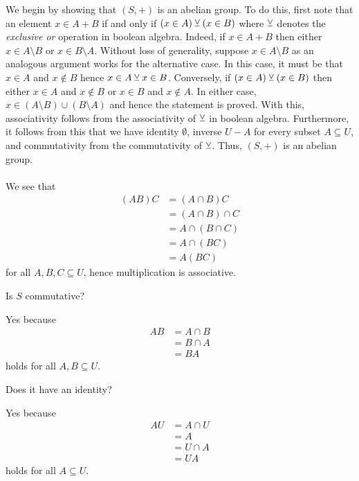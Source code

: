 \begin{enumerate}[(a)]
\begin{solution}
		We begin by showing that $(S, +)$ is an abelian group. To do this, first note that an element $x \in A + B$ if and only if $(x \in A) \veebar (x \in B)$ where $\veebar$ denotes the \textit{exclusive or} operation in boolean algebra. Indeed, if $x \in A + B$ then either $x \in A \setminus B$ or $x \in B \setminus A$. Without loss of generality, suppose $x \in A \setminus B$ as an analogous argument works for the alternative case. In this case, it must be that $x \in A$ and $x \notin B$ hence $x \in A \veebar x \in B$. Conversely, if $(x \in A) \veebar (x \in B)$ then either $x \in A$ and $x \notin B$ or $x \in B$ and $x \notin A$. In either case, $x \in (A \setminus B) \cup (B \setminus A)$ and hence the statement is proved. With this, associativity follows from the associativity of $\veebar$ in boolean algebra. Furthermore, it follows from this that we have identity $\emptyset$, inverse $U - A$ for every subset $A \subseteq U$, and commutativity from the commutativity of $\veebar$. Thus, $(S, +)$ is an abelian group.\\
		\\
		We see that 
		\begin{align*}
			(AB)C &= (A \cap B)C\\
			&= (A \cap B)\cap C\\
			&= A \cap (B \cap C)\\
			&= A \cap (BC)\\
			&= A(BC)
		\end{align*}
		for all $A, B, C \subseteq U$, hence multiplication is associative. 
	\end{solution}
	\begin{lightgraybox}
		Is $S$ commutative?
	\end{lightgraybox}
	\begin{solution}
		Yes because
		\begin{align*}
			AB &= A \cap B\\
			&= B \cap A\\
			&= BA
		\end{align*}
		holds for all $A, B \subseteq U$.
	\end{solution}
	\begin{lightgraybox}
		Does it have an identity?
	\end{lightgraybox}
	\begin{solution}
		Yes because
		\begin{align*}
			AU &= A \cap U\\
			&= A\\
			&= U\cap A\\
			&= UA
		\end{align*}
		holds for all $A \subseteq U$.
	\end{solution}
\end{enumerate}

